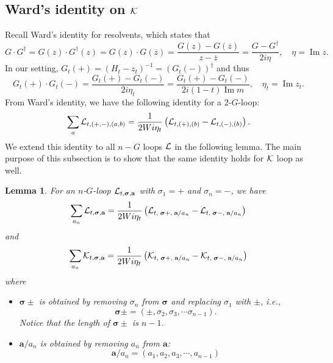 \documentclass[10pt,reqno]{article}
\DeclareMathOperator{\im}{{\mathrm{Im}}}
\renewcommand{\bar}{\overline}
\theoremstyle{plain} %
\newtheorem{lemma}[theorem]{Lemma}
\theoremstyle{remark}
\numberwithin{equation}{section}
\begin{document}
\subsection{Ward's identity on \texorpdfstring{$\cal K$}{K}}
Recall Ward's identity for resolvents, which states that
$$
G \cdot G^\dagger =G(z)\cdot G^\dagger(z)=G(z)\cdot G(\bar z)=\frac{G(z)-G(\bar z)}{z-\bar z}= \frac{G-G^\dagger}{2i\eta}, \quad \eta=\im z.
$$
In our setting, $G_t(+)=(H_t-z_t)^{-1}=\left(G_t(-)\right)^\dagger $ and thus
\begin{equation}
    \label{WI_2G}
G_t(+)\cdot G_t(-)= \frac{G_t(+)-G_t(-)}{2i\eta_t}=\frac{G_t(+)-G_t(-)}{ 2i (1-t)\im m},\quad \eta_t=\im z_t.
\end{equation}
 From Ward's identity, we  have the following identity for a $2$-$G$-loop: 
$$
\sum_a {\cal L}_{t, (+,-), (a,b)}=\frac{1}{2Wi\eta_t}\left({\cal L}_{t, (+), (b)}-{\cal L}_{t, (-), (b)}\right).
$$
We extend this identity  to all $n-G$ loops ${\cal L}$  in the following lemma. The main purpose of this subsection is to show that the same identity holds for  $\cal K$
loop as well. 

\begin{lemma}\label{lem_WI_K} For an $n$-$G$-loop ${\cal L}_{t, \boldsymbol{\sigma}, \textbf{a}}$ with 
$\sigma_1=+$ and $\sigma_n=-$, 
we have
\begin{equation}\label{WI_calL}
  \sum_{a_n}{\cal L}_{t, \boldsymbol{\sigma}, \textbf{a}}=
\frac{1}{2Wi\eta_t}\left({\cal L}_{t, \; \boldsymbol{\sigma}+,  \; \textbf{a}/a_n}- {\cal L}_{t, \; \boldsymbol{\sigma}-,  \; \textbf{a}/a_n}\right)  
\end{equation}
and
\begin{equation}\label{WI_calK}
  \sum_{a_n}{\cal K}_{t, \boldsymbol{\sigma}, \textbf{a}}=
\frac{1}{2Wi\eta_t}\left({\cal K}_{t, \; \boldsymbol{\sigma}+,  \; \textbf{a}/a_n}
- {\cal K}_{t, \; \boldsymbol{\sigma}-,  \; \textbf{a}/a_n}\right)  
\end{equation}
where 
\begin{itemize}
\item  $\boldsymbol{\sigma}\pm$ is obtained by removing $\sigma_n$ from $\boldsymbol{\sigma}$ and replacing $\sigma_1$ with $\pm$, i.e., 
    $$
\boldsymbol{\sigma}\pm=(\pm, \sigma_2, \sigma_3,\cdots \sigma_{ n-1}).$$
Notice that  the length of $\boldsymbol{\sigma}\pm$ is $n-1$. 
\item  $\textbf{a}/a_n$ is obtained by removing $a_n$ from $\textbf{a}$:
 $$
\textbf{a}/a_n=(a_1, a_2,a_3,\cdots, a_{n-1})
$$
\end{itemize}
\end{lemma}
\end{document}
